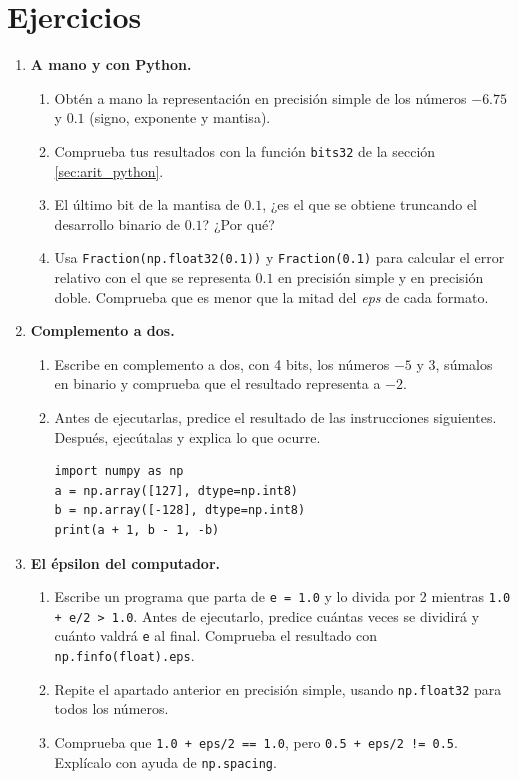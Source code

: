 \section{Ejercicios}
\begin{enumerate}
\item \label{ej:ieee_mano} \textbf{A mano y con Python.}
\begin{enumerate}
\item Obtén a mano la representación en precisión simple de los números $-6.75$ y $0.1$ (signo, exponente y mantisa).
\item Comprueba tus resultados con la función \texttt{bits32} de la sección \ref{sec:arit_python}.
\item El último bit de la mantisa de $0.1$, ¿es el que se obtiene truncando el desarrollo binario de $0.1$? ¿Por qué?
\item Usa \texttt{Fraction(np.float32(0.1))} y \texttt{Fraction(0.1)} para calcular el error relativo con el que se representa $0.1$ en precisión simple y en precisión doble. Comprueba que es menor que la mitad del \emph{eps} de cada formato.
\end{enumerate}

\item \textbf{Complemento a dos.}
\begin{enumerate}
\item Escribe en complemento a dos, con 4 bits, los números $-5$ y $3$, súmalos en binario y comprueba que el resultado representa a $-2$.
\item Antes de ejecutarlas, predice el resultado de las instrucciones siguientes. Después, ejecútalas y explica lo que ocurre.
\begin{verbatim}
import numpy as np
a = np.array([127], dtype=np.int8)
b = np.array([-128], dtype=np.int8)
print(a + 1, b - 1, -b)
\end{verbatim}
\end{enumerate}

\item \textbf{El épsilon del computador.}
\begin{enumerate}
\item Escribe un programa que parta de \texttt{e = 1.0} y lo divida por 2 mientras \texttt{1.0 + e/2 > 1.0}. Antes de ejecutarlo, predice cuántas veces se dividirá y cuánto valdrá \texttt{e} al final. Comprueba el resultado con \texttt{np.finfo(float).eps}.
\item Repite el apartado anterior en precisión simple, usando \texttt{np.float32} para todos los números.
\item Comprueba que \texttt{1.0 + eps/2 == 1.0}, pero \texttt{0.5 + eps/2 != 0.5}. Explícalo con ayuda de \texttt{np.spacing}.
\end{enumerate}


\end{enumerate}
